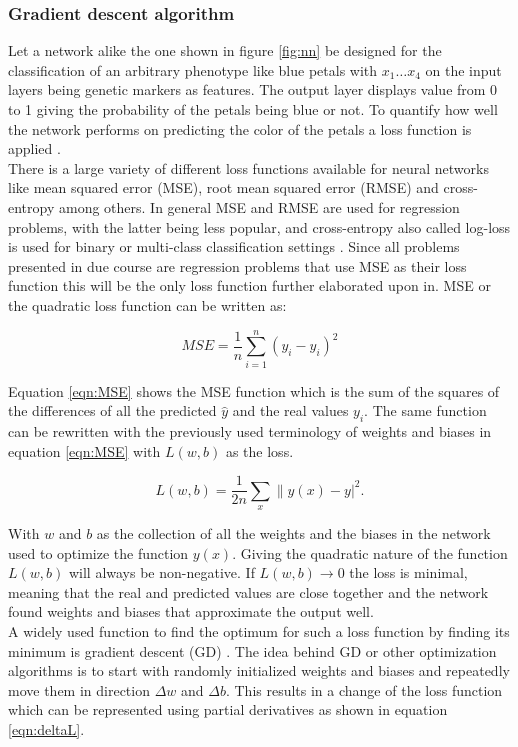 \subsubsection{Gradient descent algorithm}

Let a network alike the one shown in figure \ref{fig:nn} be designed for the
classification of an arbitrary phenotype like blue petals with $x_1 \dots x_4$ on the
input layers being genetic markers as features. The output layer displays value from 0 to
1 giving the probability of the petals being blue or not. To quantify how well the network
performs on predicting the color of the petals a loss
function is applied \cite{schmidhuber2015deep}. \\
There is a large variety of different loss functions available for neural networks like
mean squared error (MSE), root mean squared error (RMSE) and cross-entropy among
others. In general MSE and RMSE are used for regression problems, with the latter being
less popular, and cross-entropy also called log-loss is used for binary or multi-class
classification settings \cite{janocha2017loss}. Since all problems presented in due course
are regression problems that use MSE as their loss function this will be the only loss
function further elaborated upon in. MSE or the quadratic loss function can be written as:

\begin{equation}
 MSE = \frac{1}{n} \sum_{i=1}^n (y_i - \hat{y}_i)^2
 \label{eqn:MSE}
\end{equation}

Equation \ref{eqn:MSE} shows the MSE function which is the sum of the squares of the
differences of all the predicted $\hat{y}$ and the real values $y_i$. The same function
can be rewritten with the previously used terminology of weights and biases in equation
\ref{eqn:MSE} with $L(w,b)$ as the loss.

\begin{equation}
  L(w,b) = \frac{1}{2n} \sum_x \| y(x) - y|^2.
 \label{eqn:MSE2}
\end{equation}


With $w$ and $b$ as the collection of all the weights and the biases in the network used
to optimize the function $y(x)$. Giving the quadratic nature of the function $L(w,b)$ will
always be non-negative. If $L(w,b) \rightarrow 0$ the loss is minimal, meaning that the
real and predicted values are close together and the network found weights and biases that approximate the output well. \\
A widely used function to find the optimum for such a loss function by finding its minimum
is gradient descent (GD) \cite{bottou1991stochastic}. The idea behind GD or other
optimization algorithms is to start with randomly initialized weights and biases and
repeatedly move them in direction $\Delta w$ and $\Delta b$. This results in a change of
the loss function which can be represented using partial derivatives as shown in equation
\ref{eqn:deltaL}.

